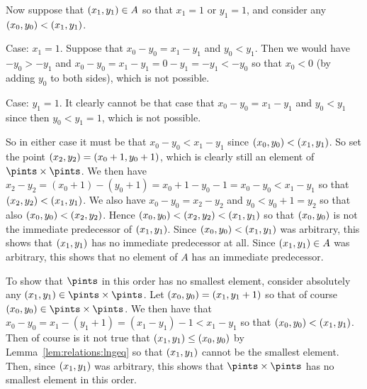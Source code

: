 {{    Now suppose that $(x_{1}, y_{1}) \in A$ so that $x_1 = 1$ or $y_1 = 1$, and consider any $(x_{0}, y_{0}) < (x_{1}, y_{1})$.

    Case: $x_1 = 1$.
    Suppose that $x_0-y_0 = x_1-y_1$ and $y_0 < y_1$.
    Then we would have $-y_0 > -y_1$ and $x_0-y_0 = x_1-y_1 = 0 - y_1 = -y_1 < -y_0$ so that $x_0 < 0$ (by adding $y_0$ to both sides), which is not possible.

    Case: $y_1 = 1$.
    It clearly cannot be that case that $x_0-y_0 = x_1-y_1$ and $y_0 < y_1$ since then $y_0 < y_1 = 1$, which is not possible.

    So in either case it must be that $x_0-y_0 < x_1-y_1$ since $(x_{0}, y_{0}) < (x_{1}, y_{1})$.
    So set the point $(x_{2}, y_{2}) = (x_0+1,y_0+1)$, which is clearly still an element of $\pintss$.
    We then have $x_2-y_2 = (x_0+1)-(y_0+1) = x_0+1-y_0-1 = x_0-y_0 < x_1-y_1$ so that $(x_{2}, y_{2}) < (x_{1}, y_{1})$.
    We also have $x_0-y_0 = x_2-y_2$ and $y_0 < y_0+1 = y_2$ so that also $(x_{0}, y_{0}) < (x_{2}, y_{2})$.
    Hence $(x_{0}, y_{0}) < (x_{2}, y_{2}) < (x_{1}, y_{1})$ so that $(x_{0}, y_{0})$ is not the immediate predecessor of $(x_{1}, y_{1})$.
    Since $(x_{0}, y_{0}) < (x_{1}, y_{1})$ was arbitrary, this shows that $(x_{1}, y_{1})$ has no immediate predecessor at all.
    Since $(x_{1}, y_{1}) \in A$ was arbitrary, this shows that no element of $A$ has an immediate predecessor.

    To show that $\pints$ in this order has no smallest element, consider absolutely any $\ppt{1} \in \pintss$.
    Let $(x_{0}, y_{0}) = (x_1,y_1+1)$ so that of course $\ppt{0} \in \pintss$.
    We then have that $x_0 - y_0 = x_1 - (y_1+1) = (x_1 - y_1) - 1 < x_1 - y_1$ so that $(x_{0}, y_{0}) < (x_{1}, y_{1})$.
    Then of course is it not true that $(x_{1}, y_{1}) \leq (x_{0}, y_{0})$ by Lemma~\ref{lem:relations:lngeq} so that $(x_{1}, y_{1})$ cannot be the smallest element.
    Then, since $(x_{1}, y_{1})$ was arbitrary, this shows that $\pintss$ has no smallest element in this order.
  }

}
